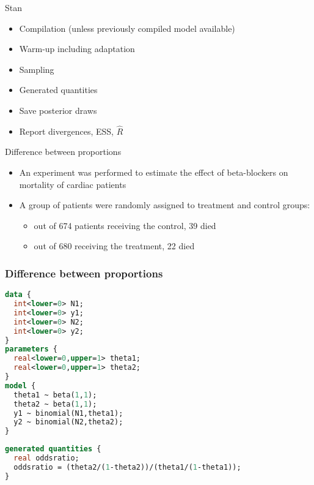 \documentclass[finnish,english,t]{beamer}
\begin{document}
\begin{frame}{Stan}
  
  \begin{itemize}
  \item Compilation (unless previously compiled model available)
  \item Warm-up including adaptation
  \item Sampling
  \item Generated quantities
  \item Save posterior draws
  \item Report divergences, ESS, $\widehat{R}$
  \end{itemize}

\end{frame}

\begin{frame}{Difference between proportions}
  
\begin{itemize}
  \item An experiment was performed to estimate the effect of
    beta-blockers on mortality of cardiac patients
  \item A group of
    patients were randomly assigned to treatment and control groups:
    \begin{itemize}
    \item out of 674 patients receiving the control, 39 died
    \item out of 680 receiving the treatment, 22 died
    \end{itemize}
  \end{itemize}
\end{frame}

\begin{frame}[fragile]
  \frametitle{Difference between proportions}

  
  \vspace{-0.5\baselineskip}
  {\small\color{gray}
    {
\begin{lstlisting}[language=Stan]
data {
  int<lower=0> N1;
  int<lower=0> y1;
  int<lower=0> N2;
  int<lower=0> y2;
}
parameters {
  real<lower=0,upper=1> theta1;
  real<lower=0,upper=1> theta2;
}
model {
  theta1 ~ beta(1,1);
  theta2 ~ beta(1,1);
  y1 ~ binomial(N1,theta1);
  y2 ~ binomial(N2,theta2);
}
\end{lstlisting}
    }
    {
\begin{lstlisting}[language=Stan]
generated quantities {
  real oddsratio;
  oddsratio = (theta2/(1-theta2))/(theta1/(1-theta1));
}
\end{lstlisting}
    }
  }
\end{frame}
\end{document}
